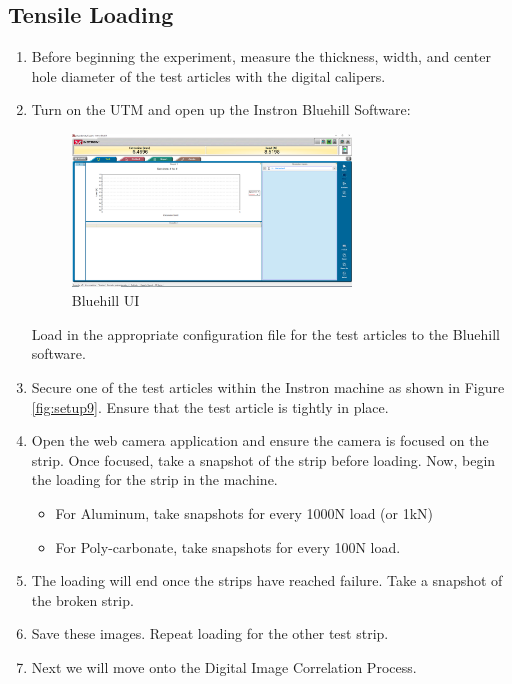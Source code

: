\documentclass{article}
\begin{document}
\subsection{Tensile Loading}
\begin{enumerate}
    \item Before beginning the experiment, measure the thickness, width, and center hole diameter of the test articles with the digital calipers.
    \item Turn on the UTM and open up the Instron Bluehill Software:
    \begin{figure}[H]
        \centering
        \includegraphics[width = 0.7\textwidth]{lab9images/instrom_bluehill_page.PNG}
        \caption{Bluehill UI}
        \label{fig:bluehill}
    \end{figure}

    Load in the appropriate configuration file for the test articles to the Bluehill software.

    \item Secure one of the test articles within the Instron machine as shown in Figure \ref{fig:setup9}. Ensure that the test article is tightly in place. 

    \item Open the web camera application and ensure the camera is focused on the strip. Once focused, take a snapshot of the strip before loading. Now, begin the loading for the strip in the machine. 
    \begin{itemize}
        \item For Aluminum, take snapshots for every 1000N load (or 1kN)
        \item For Poly-carbonate, take snapshots for every 100N load.
    \end{itemize}

    \item The loading will end once the strips have reached failure. Take a snapshot of the broken strip. 
    \item Save these images. Repeat loading for the other test strip.
    \item Next we will move onto the Digital Image Correlation Process.
\end{enumerate}
\end{document}

